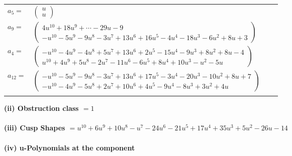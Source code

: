 \documentclass[1p]{elsarticle_modified}
\theoremstyle{definition}
\begin{document}
\begin{tabular}{m{7pt} m{180pt} m{7pt} m{180pt} }
\flushright $a_{5}=$&$\begin{pmatrix}u\\u\end{pmatrix}$ \\
\flushright $a_{9}=$&$\begin{pmatrix}4 u^{10}+18 u^9+\cdots-29 u-9\\- u^{10}-5 u^9-9 u^8-3 u^7+13 u^6+16 u^5-4 u^4-18 u^3-6 u^2+8 u+3\end{pmatrix}$ \\
\flushright $a_{4}=$&$\begin{pmatrix}- u^{10}-4 u^9-4 u^8+5 u^7+13 u^6+2 u^5-15 u^4-9 u^3+8 u^2+8 u-4\\u^{10}+4 u^9+5 u^8-2 u^7-11 u^6-6 u^5+8 u^4+10 u^3- u^2-5 u\end{pmatrix}$ \\
\flushright $a_{12}=$&$\begin{pmatrix}- u^{10}-5 u^9-9 u^8-3 u^7+13 u^6+17 u^5-3 u^4-20 u^3-10 u^2+8 u+7\\- u^{10}-4 u^9-5 u^8+2 u^7+10 u^6+4 u^5-9 u^4-8 u^3+3 u^2+4 u\end{pmatrix}$\\&\end{tabular}
\flushleft \textbf{(ii) Obstruction class $= 1$}\\~\\
\flushleft \textbf{(iii) Cusp Shapes $= u^{10}+6 u^9+10 u^8- u^7-24 u^6-21 u^5+17 u^4+35 u^3+5 u^2-26 u-14$}\\~\\
\newpage\renewcommand{\arraystretch}{1}
\flushleft \textbf{(iv) u-Polynomials at the component}\newline \\
\end{document}
